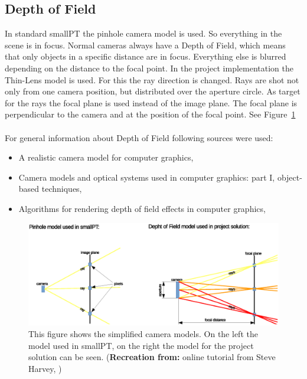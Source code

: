\documentclass[11pt,a4paper]{article}
\begin{document}
\subsection{Depth of Field}
In standard smallPT the pinhole camera model is used. So everything in the scene is in focus. Normal cameras always have a Depth of Field, which means that only objects in a specific distance are in focus. Everything else is blurred depending on the distance to the focal point. In the project implementation the Thin-Lens model is used. For this the ray direction is changed. Rays are shot not only from one camera position, but distributed over the aperture circle. As target for the rays the focal plane is used instead of the image plane. The focal plane is perpendicular to the camera and at the position of the focal point. See Figure~\ref{fig:1}
\\
\\
For general information about Depth of Field following sources were used:
\begin{itemize}
\item
A realistic camera model for computer graphics, \cite{kolb1995realistic}
\item
Camera models and optical systems used in computer graphics: part I, object-based techniques, \cite{barsky2003camera}
\item
Algorithms for rendering depth of field effects in computer graphics, \cite{barsky2008algorithms}

\end{itemize}

\begin{figure}[h]
\begin{center}
\includegraphics[trim=40 30 60 60, clip=true, scale=0.6]{images/pinholeVsDepthOfField}
\caption[Pinhole implementation vs Thin Lens implementation]{This figure shows the simplified camera models. On the left the model used in smallPT, on the right the model for the project solution can be seen. (\textbf{Recreation from:} online tutorial from Steve Harvey, \cite{link:Harvey})}
\label{fig:1}
\end{center}
\end{figure}
\end{document}
